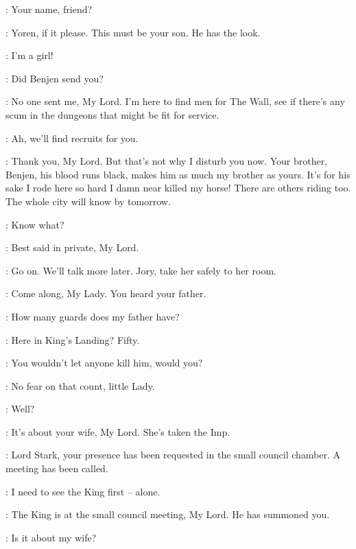 
\NED: Your name, friend? 

\YOREN: Yoren, if it please. This must be your son. He has the look. 

\ARYA: I'm a girl! 

\NED: Did Benjen send you? 

\YOREN: No one sent me, My Lord. I'm here to find men for The Wall, see if there's any scum in the dungeons that might be fit for service. 

\NED: Ah, we'll find recruits for you. 

\YOREN: Thank you, My Lord. But that's not why I disturb you now. Your brother, Benjen, his blood runs black, makes him as much my brother as yours. It's for his sake I rode here so hard I damn near killed my horse! There are others riding too. The whole city will know by tomorrow. 

\NED: Know what? 

\YOREN: Best said in private, My Lord. 

\NED:  Go on. We'll talk more later. Jory, take her safely to her room. 

\JORY: Come along, My Lady. You heard your father. 


\ARYA: How many guards does my father have? 

\JORY: Here in King's Landing? Fifty. 

\ARYA: You wouldn't let anyone kill him, would you? 

\JORY: No fear on that count, little Lady. 


\NED: Well? 

\YOREN: It's about your wife, My Lord. She's taken the Imp. 



\STEWARD: Lord Stark, your presence has been requested in the small council chamber. A meeting has been called. 

\NED: I need to see the King first -- alone. 

\STEWARD: The King is at the small council meeting, My Lord. He has summoned you. 

\NED: Is it about my wife? 

